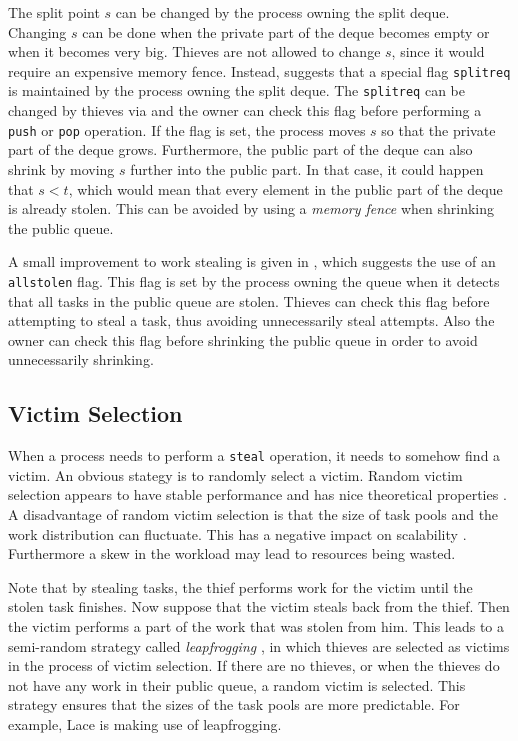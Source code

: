The split point $s$ can be changed by the process owning the split deque. Changing $s$ can be done when the private part of the deque becomes empty or when it becomes very big. Thieves are not allowed to change $s$, since it would require an expensive memory fence. Instead, \cite{lace} suggests that a special flag \texttt{splitreq} is maintained by the process owning the split deque. The \texttt{splitreq} can be changed by thieves via  and the owner can check this flag before performing a \texttt{push} or \texttt{pop} operation. If the flag is set, the process moves $s$ so that the private part of the deque grows. Furthermore, the public part of the deque can also shrink by moving $s$ further into the public part. In that case, it could happen that $s < t$, which would mean that every element in the public part of the deque is already stolen. This can be avoided by using a \emph{memory fence} when shrinking the public queue.

A small improvement to work stealing is given in \cite{lace}, which suggests the use of an \texttt{allstolen} flag. This flag is set by the process owning the queue when it detects that all tasks in the public queue are stolen. Thieves can check this flag before attempting to steal a task, thus avoiding unnecessarily steal attempts. Also the owner can check this flag before shrinking the public queue in order to avoid unnecessarily shrinking.

\subsection{Victim Selection}
When a process needs to perform a \texttt{steal} operation, it needs to somehow find a victim. An obvious stategy is to randomly select a victim. Random victim selection appears to have stable performance and has nice theoretical properties \cite{Blumofe:1998:PWS:277858.277939}. A disadvantage of random victim selection is that the size of task pools and the work distribution can fluctuate. This has a negative impact on scalability \cite{dinan2009scalable}. Furthermore a skew in the workload may lead to resources being wasted. 

Note that by stealing tasks, the thief performs work for the victim until the stolen task finishes. Now suppose that the victim steals back from the thief. Then the victim performs a part of the work that was stolen from him. This leads to a semi-random strategy called \emph{leapfrogging} \cite{Wagner:1993:LPT:173284.155354}, in which thieves are selected as victims in the process of victim selection. If there are no thieves, or when the thieves do not have any work in their public queue, a random victim is selected. This strategy ensures that the sizes of the task pools are more predictable. For example, Lace is making use of leapfrogging.

